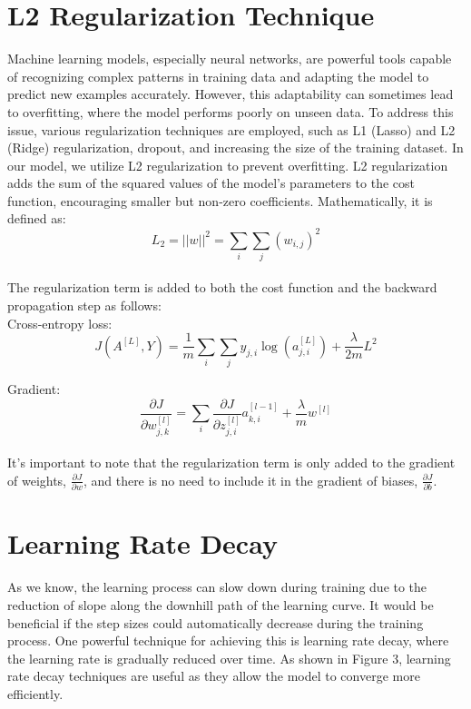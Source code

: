 \documentclass[12pt]{article}
\begin{document}
\section*{\large L2 Regularization Technique}

Machine learning models, especially neural networks, are powerful tools capable of recognizing complex patterns in training data and adapting the model to predict new examples accurately. However, this adaptability can sometimes lead to overfitting, where the model performs poorly on unseen data. To address this issue, various regularization techniques are employed, such as L1 (Lasso) and L2 (Ridge) regularization, dropout, and increasing the size of the training dataset. In our model, we utilize L2 regularization to prevent overfitting. L2 regularization adds the sum of the squared values of the model’s parameters to the cost function, encouraging smaller but non-zero coefficients. Mathematically, it is defined as:\\[6px]

$$L_2=||w||^2=\sum_i\sum_j \left(w_{i,j}\right)^2$$\\[6px]

The regularization term is added to both the cost function and the backward propagation step as follows:\\[6px]

Cross-entropy loss:\\[6px]

$$J\left(A^{[L]},Y\right)=\frac{1}{m}\sum_{i}\sum_{j}y_{j,i}\log\left(a^{[L]}_{j,i}\right)+\frac{\lambda}{2m}L^2$$

Gradient:\\[6px]

$$\frac{\partial J}{\partial w^{[l]}_{j,k}}=\sum_i\frac{\partial J}{\partial z^{[l]}_{j,i}}a^{[l-1]}_{k,i} + \frac{\lambda}{m}w^{[l]}$$\\[6px]

It's important to note that the regularization term is only added to the gradient of weights, $\frac{\partial J}{\partial w}$, and there is no need to include it in the gradient of biases, $\frac{\partial J}{\partial b}$.




\section*{\large Learning Rate Decay}

As we know, the learning process can slow down during training due to the reduction of slope along the downhill path of the learning curve. It would be beneficial if the step sizes could automatically decrease during the training process. One powerful technique for achieving this is learning rate decay, where the learning rate is gradually reduced over time. As shown in Figure 3, learning rate decay techniques are useful as they allow the model to converge more efficiently.
\end{document}
